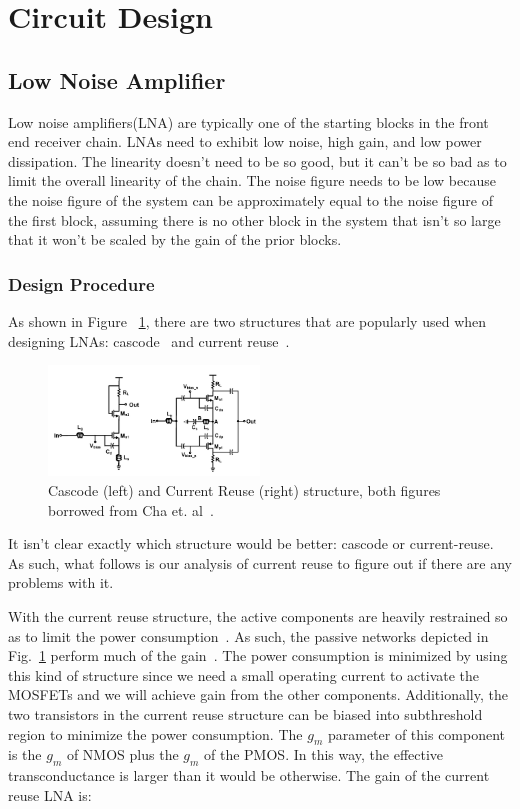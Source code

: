 \section{Circuit Design}
\subsection{Low Noise Amplifier}
Low noise amplifiers(LNA) are typically one of the starting blocks in the front end receiver chain. LNAs need to exhibit low noise, high gain, and low power dissipation. The linearity doesn't need to be so good, but it can't be so bad as to limit the overall linearity of the chain. The noise figure needs to be low because the noise figure of the system can be approximately equal to the noise figure of the first block, assuming there is no other block in the system that isn't so large that it won't be scaled by the gain of the prior blocks. 

\subsubsection{Design Procedure}
As shown in Figure ~\ref{fig:lna}, there are two structures that are popularly used when designing LNAs:  cascode~\cite{Razavi} and current reuse~\cite{lna}. 

\begin{figure}[h]
   \centering
    \includegraphics[width=0.5\textwidth]{figures/LNA.png}
    \caption{Cascode (left) and Current Reuse (right) structure, both figures borrowed from Cha et. al~\cite{lna}.}
    \label{fig:lna}
\end{figure}

It isn't clear exactly which structure would be better: cascode or current-reuse. As such, what follows is our analysis of current reuse to figure out if there are any problems with it.

With the current reuse structure, the active components are heavily restrained so as to limit the power consumption~\cite{lna}. As such, the passive networks depicted in Fig.~\ref{fig:lna} perform much of the gain~\cite{lna}. The power consumption is minimized by using this kind of structure since we need a small operating current to activate the MOSFETs and we will achieve gain from the other components. Additionally, the two transistors in the current reuse structure can be biased into subthreshold region to minimize the power consumption. The $g_m$ parameter of this component is the $g_m$ of NMOS plus the $g_m$ of the PMOS. In this way, the effective transconductance is larger than it would be otherwise. The gain of the current reuse LNA is:

